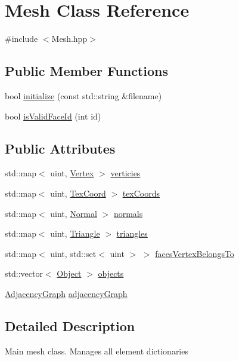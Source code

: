 \hypertarget{class_mesh}{}\section{Mesh Class Reference}
\label{class_mesh}


{\ttfamily \#include $<$Mesh.\+hpp$>$}

\subsection*{Public Member Functions}
\begin{DoxyCompactItemize}
\item 
bool \hyperlink{class_mesh_ad93d51d3938b1fe01816746f7d6a121f}{initialize} (const std\+::string \&filename)
\item 
bool \hyperlink{class_mesh_aaa92d27cfbbb7b2ae11d94ded72de982}{is\+Valid\+Face\+Id} (int id)
\end{DoxyCompactItemize}
\subsection*{Public Attributes}
\begin{DoxyCompactItemize}
\item 
std\+::map$<$ uint, \hyperlink{struct_vertex}{Vertex} $>$ \hyperlink{class_mesh_a2cef656e11f17c6974a418c4fa0755fe}{verticies}
\item 
std\+::map$<$ uint, \hyperlink{struct_tex_coord}{Tex\+Coord} $>$ \hyperlink{class_mesh_a615f86622e292b9bfa581cfad823b375}{tex\+Coords}
\item 
std\+::map$<$ uint, \hyperlink{struct_normal}{Normal} $>$ \hyperlink{class_mesh_afe59cf4410182ce7c42447b635c745e1}{normals}
\item 
std\+::map$<$ uint, \hyperlink{struct_triangle}{Triangle} $>$ \hyperlink{class_mesh_a6afb31bd01dac6b21a548341d389b421}{triangles}
\item 
std\+::map$<$ uint, std\+::set$<$ uint $>$ $>$ \hyperlink{class_mesh_a5ad3c61ae2ecabc596a9d9cd01f29252}{faces\+Vertex\+Belongs\+To}
\item 
std\+::vector$<$ \hyperlink{struct_object}{Object} $>$ \hyperlink{class_mesh_ad221985419bdc4e3f30396073e7aa107}{objects}
\item 
\hyperlink{class_adjacency_graph}{Adjacency\+Graph} \hyperlink{class_mesh_a7867e8a9f5b51b153a13d4e302578a1f}{adjacency\+Graph}
\end{DoxyCompactItemize}


\subsection{Detailed Description}
Main mesh class. Manages all element dictionaries 

